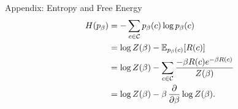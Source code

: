 \documentclass[presentation,12pt]{beamer}
\newcommand{\Expct}{\mathbb{E}}
\def\C{{\cal C}}
\def\E{{\mathbb E}}
\begin{document}



\appendix

\setfootline{
  \textcolor{gray!60}{
    \tiny\insertshortdate \hfill \insertshortauthor \quad 
    Appendix-\insertframenumber/\inserttotalframenumber
  }
}


\begin{frame}{Appendix: Entropy and Free Energy}
\begin{align*}
  H(p_\beta) &= -\sum_{c\in \C} p_\beta(c) \log p_\beta(c) \notag \\
    &= \log Z(\beta) - \Expct_{p_\beta(c)}[R(c)] \notag \\
    &= \log Z(\beta) - \sum_{c \in \C} \frac{- \beta R(c) e^{-\beta R(c)}}{Z(\beta)} \notag \\
    &= \log Z(\beta) - \beta \, \frac{\partial}{\partial \beta} \log Z(\beta).
\end{align*}
\end{frame}
\end{document}
